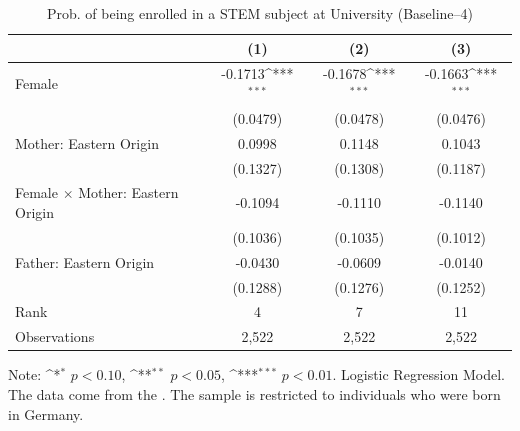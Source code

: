 \documentclass[a4paper, oneside, hyperfootnotes = false]{article}
\def\sym#1{\ifmmode^{#1}\else\(^{#1}\)\fi}
\begin{document}
{\begin{table}[ht]
	\caption[STEM subject at University (Baseline--4)]{Prob. of being enrolled in a STEM subject at University (Baseline--4)}
	\label{tab:baseline--4}
	\begin{center}
		\begin{tabular}{l*{3}{c}}
			\toprule
			&\multicolumn{1}{c}{(1)}         &\multicolumn{1}{c}{(2)}         &\multicolumn{1}{c}{(3)}         \\
			\midrule
			Female              &     -0.1713\sym{***}&     -0.1678\sym{***}&     -0.1663\sym{***}\\
			&    (0.0479)         &    (0.0478)         &    (0.0476)         \\
			\addlinespace
			Mother: Eastern Origin&      0.0998         &      0.1148         &      0.1043         \\
			&    (0.1327)         &    (0.1308)         &    (0.1187)         \\
			\addlinespace
			Female $\times$ Mother: Eastern Origin&     -0.1094         &     -0.1110         &     -0.1140         \\
			&    (0.1036)         &    (0.1035)         &    (0.1012)         \\
			\addlinespace
			Father: Eastern Origin&     -0.0430         &     -0.0609         &     -0.0140         \\
			&    (0.1288)         &    (0.1276)         &    (0.1252)         \\
			\midrule
			Rank                &      4         &     7         &     11         \\
			Observations                   &   2,522         &   2,522         &   2,522         \\
			\bottomrule
		\end{tabular}
		
		\vspace{2mm}
		
		\parbox{10cm}{
			\linespread{1}\footnotesize Note: \sym{*} \(p<0.10\), \sym{**} \(p<0.05\), \sym{***} \(p<0.01\). Logistic Regression Model. The data come from the \cite{SOEP2023}. The sample is restricted to individuals who were born in Germany.}
		
	\end{center}
\end{table}

}
\end{document}
